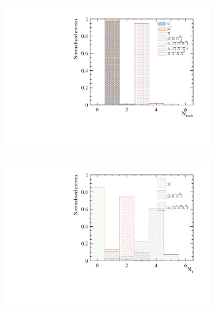 \documentclass[a4paper,11pt]{article}
\begin{document}
\begin{figure}[!tbp]
\centering %

\begin{subfigure}[b]{0.45\textwidth}
 \includegraphics[width=\textwidth]{plots/var2/nCharge_100GeV_improved} 
  \caption{}
  \label{fig:nCharge}
\end{subfigure}
\begin{subfigure}[b]{0.45\textwidth}
 \includegraphics[width=\textwidth]{plots/var2/nPhoton_100GeV_improved} 
  \caption{}
  \label{fig:nPhoton}
\end{subfigure}


\end{figure}
\end{document}
